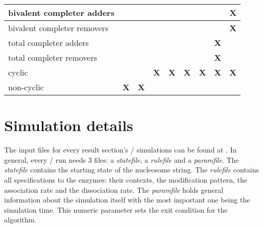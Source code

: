 \begin{table}
\begin{tabular}{l|c|c|c|c|c|c|c|c|}
                bivalent completer adders   &                      &                      &                      &                      &                      &                     &            & \textbf{X}  \\\hline
                bivalent completer removers &                      &                      &                      &                      &                      &                     &            & \textbf{X}  \\\hline
                total completer adders      &                      &                      &                      &                      &                      &                     & \textbf{X} &             \\\hline
                total completer removers    &                      &                      &                      &                      &                      &                     & \textbf{X} &             \\\hline
                cyclic                      &                      &                      & \textbf{X}           & \textbf{X}           & \textbf{X}           & \textbf{X}          & \textbf{X} & \textbf{X}  \\\hline
                non-cyclic                  & \textbf{X}           & \textbf{X}           &                      &                      &                      &                     &            & \\\hline
                \end{tabular}
                \label{tab:EnzymeRuleSets}
            \end{table}
    \section{Simulation details}
    \label{sec:simulationDetails}
        The input files for every result section's \ed/ simulations can be found at \cite{Krecké2021}. In general, every \ed/ run needs 3 files: a \textit{statefile}, a \textit{rulefile} and a \textit{paramfile}. The \textit{statefile} contains the starting state of the nucleosome string. The \textit{rulefile} contains all specifications to the enzymes: their contexts, the modification pattern, the association rate and the dissociation rate. The \textit{paramfile} holds general information about the simulation itself with the most important one being the simulation time. This numeric parameter sets the exit condition for the algorithm.


